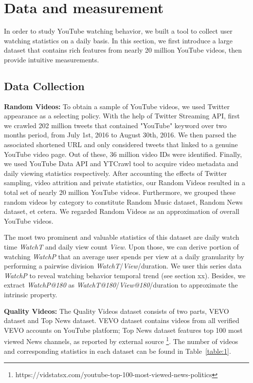 \section{Data and measurement}

In order to study YouTube watching behavior, we built a tool to collect user watching statistics on a daily basis. In this section, we first introduce a large dataset that contains rich features from nearly 20 million YouTube videos, then provide intuitive measurements.

\subsection{Data Collection}

\noindent\textbf{Random Videos:} To obtain a sample of YouTube videos, we used Twitter appearance as a selecting policy. With the help of Twitter Streaming API, first we crawled 202 million tweets that contained "YouTube" keyword over two months period, from July 1st, 2016 to August 30th, 2016. We then parsed the associated shortened URL and only considered tweets that linked to a genuine YouTube video page. Out of these, 36 million video IDs were identified. Finally, we used YouTube Data API and YTCrawl tool \cite{yu:2015lifecyle} to acquire video metadata and daily viewing statistics respectively. After accounting the effects of Twitter sampling, video attrition and private statistics, our Random Videos resulted in a total set of nearly 20 million YouTube videos. Furthermore, we grouped these random videos by category to constitute Random Music dataset, Random News dataset, et cetera. We regarded Random Videos as an approximation of overall YouTube videos.

The most two prominent and valuable statistics of this dataset are daily watch time \textit{WatchT} and daily view count \textit{View}. Upon those, we can derive portion of watching \textit{WatchP} that an average user spends per view at a daily granularity by performing a pairwise division \textit{WatchT}/\textit{View}/duration. We user this series data \textit{WatchP} to reveal watching behavior temporal trend (see section xx). Besides, we extract \textit{WatchP@180} as \textit{WatchT@180}/\textit{View@180}/duration to approximate the intrinsic property.

\noindent\textbf{Quality Videos:} The Quality Videos dataset consists of two parts, VEVO dataset and Top News dataset. VEVO dataset contains videos from all verified VEVO accounts on YouTube platform; Top News dataset features top 100 most viewed News channels, as reported by external source \footnote{https://vidstatsx.com/youtube-top-100-most-viewed-news-politics}. The number of videos and corresponding statistics in each dataset can be found in Table~\ref{table:1}.

